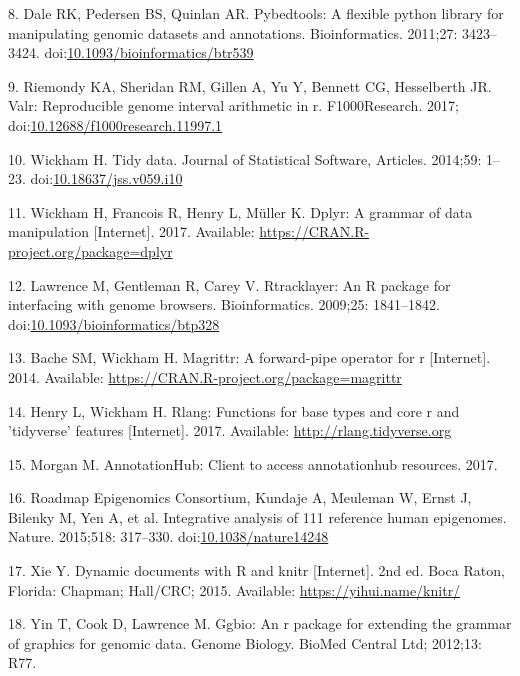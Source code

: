 \documentclass[10pt,letterpaper]{article}
\begin{document}
\hypertarget{ref-Dale2011-js}{}
8. Dale RK, Pedersen BS, Quinlan AR. Pybedtools: A flexible python
library for manipulating genomic datasets and annotations.
Bioinformatics. 2011;27: 3423--3424.
doi:\href{https://doi.org/10.1093/bioinformatics/btr539}{10.1093/bioinformatics/btr539}

\hypertarget{ref-Kent2017}{}
9. Riemondy KA, Sheridan RM, Gillen A, Yu Y, Bennett CG, Hesselberth JR.
Valr: Reproducible genome interval arithmetic in r. F1000Research. 2017;
doi:\href{https://doi.org/10.12688/f1000research.11997.1}{10.12688/f1000research.11997.1}

\hypertarget{ref-Wickham2014-jc}{}
10. Wickham H. Tidy data. Journal of Statistical Software, Articles.
2014;59: 1--23.
doi:\href{https://doi.org/10.18637/jss.v059.i10}{10.18637/jss.v059.i10}

\hypertarget{ref-Wickham2017-dplyr}{}
11. Wickham H, Francois R, Henry L, Müller K. Dplyr: A grammar of data
manipulation {[}Internet{]}. 2017. Available:
\url{https://CRAN.R-project.org/package=dplyr}

\hypertarget{ref-Lawrence2009-nt}{}
12. Lawrence M, Gentleman R, Carey V. Rtracklayer: An R package for
interfacing with genome browsers. Bioinformatics. 2009;25: 1841--1842.
doi:\href{https://doi.org/10.1093/bioinformatics/btp328}{10.1093/bioinformatics/btp328}

\hypertarget{ref-R-magrittr}{}
13. Bache SM, Wickham H. Magrittr: A forward-pipe operator for r
{[}Internet{]}. 2014. Available:
\url{https://CRAN.R-project.org/package=magrittr}

\hypertarget{ref-R-rlang}{}
14. Henry L, Wickham H. Rlang: Functions for base types and core r and
'tidyverse' features {[}Internet{]}. 2017. Available:
\url{http://rlang.tidyverse.org}

\hypertarget{ref-R-ahub}{}
15. Morgan M. AnnotationHub: Client to access annotationhub resources.
2017.

\hypertarget{ref-Roadmap_Epigenomics_Consortium2015-pr}{}
16. Roadmap Epigenomics Consortium, Kundaje A, Meuleman W, Ernst J,
Bilenky M, Yen A, et al. Integrative analysis of 111 reference human
epigenomes. Nature. 2015;518: 317--330.
doi:\href{https://doi.org/10.1038/nature14248}{10.1038/nature14248}

\hypertarget{ref-R-knitr}{}
17. Xie Y. Dynamic documents with R and knitr {[}Internet{]}. 2nd ed.
Boca Raton, Florida: Chapman; Hall/CRC; 2015. Available:
\url{https://yihui.name/knitr/}

\hypertarget{ref-R-ggbio}{}
18. Yin T, Cook D, Lawrence M. Ggbio: An r package for extending the
grammar of graphics for genomic data. Genome Biology. BioMed Central
Ltd; 2012;13: R77.

\nolinenumbers
\end{document}
